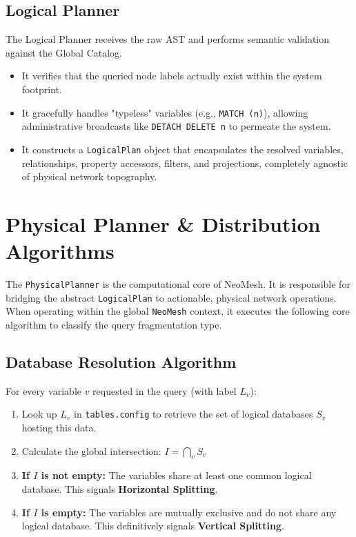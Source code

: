 \documentclass{article}
\begin{document}
\subsection{Logical Planner}
The Logical Planner receives the raw AST and performs semantic validation against the Global Catalog. 
\begin{itemize}
    \item It verifies that the queried node labels actually exist within the system footprint.
    \item It gracefully handles "typeless" variables (e.g., \texttt{MATCH (n)}), allowing administrative broadcasts like \texttt{DETACH DELETE n} to permeate the system.
    \item It constructs a \texttt{LogicalPlan} object that encapsulates the resolved variables, relationships, property accessors, filters, and projections, completely agnostic of physical network topography.
\end{itemize}

\section{Physical Planner \& Distribution Algorithms}
The \texttt{PhysicalPlanner} is the computational core of NeoMesh. It is responsible for bridging the abstract \texttt{LogicalPlan} to actionable, physical network operations. When operating within the global \texttt{NeoMesh} context, it executes the following core algorithm to classify the query fragmentation type.

\subsection{Database Resolution Algorithm}
For every variable \(v\) requested in the query (with label \(L_v\)):
\begin{enumerate}
    \item Look up \(L_v\) in \texttt{tables.config} to retrieve the set of logical databases \(S_v\) hosting this data.
    \item Calculate the global intersection: \(I = \bigcap_{v} S_v\)
    \item \textbf{If \(I\) is not empty:} The variables share at least one common logical database. This signals \textbf{Horizontal Splitting}.
    \item \textbf{If \(I\) is empty:} The variables are mutually exclusive and do not share any logical database. This definitively signals \textbf{Vertical Splitting}.
\end{enumerate}
\end{document}
